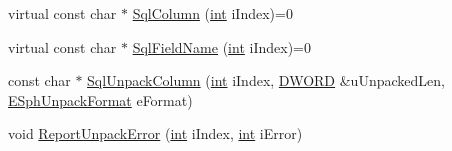 \begin{DoxyCompactItemize}
\item 
virtual const char $\ast$ \hyperlink{structCSphSource__SQL_a0ad45b702705e693aad933d45259c175}{Sql\-Column} (\hyperlink{sphinxexpr_8cpp_a4a26e8f9cb8b736e0c4cbf4d16de985e}{int} i\-Index)=0
\item 
virtual const char $\ast$ \hyperlink{structCSphSource__SQL_a2a18e609e30f415dbd6b5f6114e04dda}{Sql\-Field\-Name} (\hyperlink{sphinxexpr_8cpp_a4a26e8f9cb8b736e0c4cbf4d16de985e}{int} i\-Index)=0
\item 
const char $\ast$ \hyperlink{structCSphSource__SQL_a7fcc9c4625c221ba1319de68c0b7e842}{Sql\-Unpack\-Column} (\hyperlink{sphinxexpr_8cpp_a4a26e8f9cb8b736e0c4cbf4d16de985e}{int} i\-Index, \hyperlink{sphinxstd_8h_a798af1e30bc65f319c1a246cecf59e39}{D\-W\-O\-R\-D} \&u\-Unpacked\-Len, \hyperlink{sphinx_8h_a4d4996a14f2199e251e4f55ac3d302f0}{E\-Sph\-Unpack\-Format} e\-Format)
\item 
void \hyperlink{structCSphSource__SQL_a4b9eaf50aa904eebff7cd984d058d6db}{Report\-Unpack\-Error} (\hyperlink{sphinxexpr_8cpp_a4a26e8f9cb8b736e0c4cbf4d16de985e}{int} i\-Index, \hyperlink{sphinxexpr_8cpp_a4a26e8f9cb8b736e0c4cbf4d16de985e}{int} i\-Error)
\end{DoxyCompactItemize}

